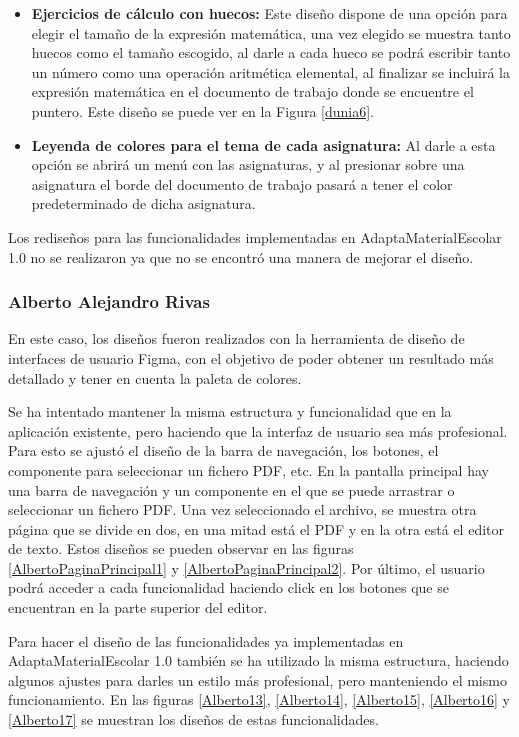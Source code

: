 \begin{itemize}
  \item  \textbf{Ejercicios de cálculo con huecos:} Este diseño dispone de una opción para elegir el tamaño de la expresión matemática, una vez elegido se muestra tanto huecos como el tamaño escogido, al darle a cada hueco se podrá escribir tanto un número como una operación aritmética elemental, al finalizar se incluirá la expresión matemática en el documento de trabajo donde se encuentre el puntero. Este diseño se puede ver en la Figura \ref{dunia6}.
  \item  \textbf{Leyenda de colores para el tema de cada asignatura:} Al darle a esta opción se abrirá un menú con las asignaturas, y al presionar sobre una asignatura el borde del documento de trabajo pasará a tener el color predeterminado de dicha asignatura.
\end{itemize}

Los rediseños para las funcionalidades implementadas en AdaptaMaterialEscolar 1.0 no se realizaron ya que no se encontró una manera de mejorar el diseño.

\subsubsection{Alberto Alejandro Rivas}
\label{sec:albertoIter}
En este caso, los diseños fueron realizados con la herramienta de diseño de interfaces de usuario Figma, con el objetivo de poder obtener un resultado más detallado y tener en cuenta la paleta de colores.

Se ha intentado mantener la misma estructura y funcionalidad que en la aplicación existente, pero haciendo que la interfaz de usuario sea más profesional. Para esto se ajustó el diseño de la barra de navegación, los botones, el componente para seleccionar un fichero PDF, etc. En la pantalla principal hay una barra de navegación y un componente en el que se puede arrastrar o seleccionar un fichero PDF. Una vez seleccionado el archivo, se muestra otra página que se divide en dos, en una mitad está el PDF y en la otra está el editor de texto. Estos diseños se pueden observar en las figuras \ref{AlbertoPaginaPrincipal1} y \ref{AlbertoPaginaPrincipal2}. Por último, el usuario podrá acceder a cada funcionalidad haciendo click en los botones que se encuentran en la parte superior del editor.

Para hacer el diseño de las funcionalidades ya implementadas en AdaptaMaterialEscolar 1.0 también se ha utilizado la misma estructura, haciendo algunos ajustes para darles un estilo más profesional, pero manteniendo el mismo funcionamiento. En las figuras \ref{Alberto13}, \ref{Alberto14}, \ref{Alberto15}, \ref{Alberto16} y \ref{Alberto17} se muestran los diseños de estas funcionalidades.

